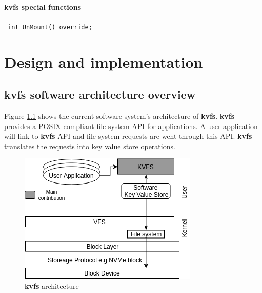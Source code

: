 \documentclass[bsc,frontabs,twoside,singlespacing,parskip,deptreport]{infthesis}     %
\begin{document}
{\subsubsection{kvfs special functions}
{\tt
	int UnMount() override;
}

\chapter{Design and implementation}

\section{kvfs software architecture overview}
Figure \ref{fig:kvfs_architecture} shows the current software system's architecture of {\bf kvfs}.  {\bf kvfs} provides a POSIX-compliant file system API for applications. A user application will link to {\bf kvfs} API and file system requests are went through this API.
{\bf kvfs} translates the requests into key value store operations. 
\begin{figure}[h]
	\centering
	\includegraphics[scale=0.6]{diagrams/kvfs_architecture_current.png}
	\caption{{\bf kvfs} architecture}
	 \label{fig:kvfs_architecture}
\end{figure}


}
\end{document}
